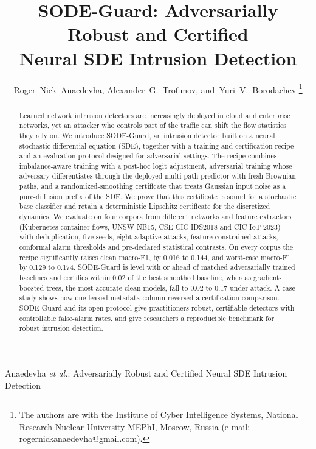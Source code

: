 \documentclass[journal]{IEEEtran}
\theoremstyle{definition}
\begin{document}
\title{SODE-Guard: Adversarially Robust and Certified\\Neural SDE Intrusion Detection}

\author{Roger~Nick~Anaedevha, Alexander~G.~Trofimov, and~Yuri~V.~Borodachev%
\thanks{The authors are with the Institute of Cyber Intelligence Systems,
National Research Nuclear University MEPhI, Moscow, Russia
(e-mail: rogernickanaedevha@gmail.com).}}

%
{Anaedevha \MakeLowercase{\textit{et al.}}: Adversarially Robust and Certified Neural SDE Intrusion Detection}

\maketitle

\begin{abstract}
Learned network intrusion detectors are increasingly deployed in cloud and
enterprise networks, yet an attacker who controls part of the traffic can shift
the flow statistics they rely on. We introduce SODE-Guard, an intrusion detector
built on a neural stochastic differential equation (SDE), together with a
training and certification recipe and an evaluation protocol designed for
adversarial settings. The recipe combines imbalance-aware training with a
post-hoc logit adjustment, adversarial training whose adversary differentiates
through the deployed multi-path predictor with fresh Brownian paths, and a
randomized-smoothing certificate that treats Gaussian input noise as a
pure-diffusion prefix of the SDE. We prove that this certificate is sound for a
stochastic base classifier and retain a deterministic Lipschitz certificate for
the discretized dynamics. We evaluate on four corpora from different networks
and feature extractors (Kubernetes container flows, UNSW-NB15,
CSE-CIC-IDS2018 and CIC-IoT-2023) with deduplication, five seeds, eight adaptive attacks,
feature-constrained attacks, conformal alarm thresholds and pre-declared
statistical contrasts. On every corpus the recipe significantly raises clean
macro-F1, by 0.016 to 0.144, and worst-case macro-F1, by 0.129 to 0.174.
SODE-Guard is level with or ahead of matched adversarially trained baselines and
certifies within 0.02 of the best smoothed baseline, whereas gradient-boosted
trees, the most accurate clean models, fall to 0.02 to 0.17 under attack. A case
study shows how one leaked metadata column reversed a certification comparison.
SODE-Guard and its open protocol give practitioners robust, certifiable
detectors with controllable false-alarm rates, and give researchers a
reproducible benchmark for robust intrusion detection.
\end{abstract}
\end{document}
